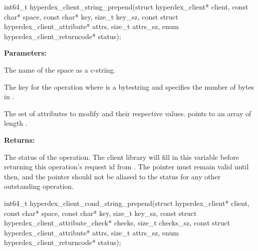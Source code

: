 \funcsep
{}
\begin{ccode}
int64_t hyperdex_client_string_prepend(struct hyperdex_client* client,
                const char* space,
                const char* key, size_t key_sz,
                const struct hyperdex_client_attribute* attrs, size_t attrs_sz,
                enum hyperdex_client_returncode* status);
\end{ccode}
\funcdesc 

\noindent\textbf{Parameters:}
\begin{description}[labelindent=\widthof{{\code{attrs}, \code{attrs\_sz}}},leftmargin=*,noitemsep,nolistsep,align=right]
\item[\code{space}] The name of the space as a c-string.
\item[\code{key}, \code{key\_sz}] The key for the operation where  is a bytestring and  specifies the number of bytes in .
\item[\code{attrs}, \code{attrs\_sz}] The set of attributes to modify and their respective values.   points to an array of length .
\end{description}

\noindent\textbf{Returns:}
\begin{description}[labelindent=\widthof{{\code{status}}},leftmargin=*,noitemsep,nolistsep,align=right]
\item[\code{status}] The status of the operation.  The client library will fill in this variable before returning this operation's request id from .  The pointer must remain valid until then, and the pointer should not be aliased to the status for any other outstanding operation.
\end{description}

\funcsep
{}
\begin{ccode}
int64_t hyperdex_client_cond_string_prepend(struct hyperdex_client* client,
                const char* space,
                const char* key, size_t key_sz,
                const struct hyperdex_client_attribute_check* checks, size_t checks_sz,
                const struct hyperdex_client_attribute* attrs, size_t attrs_sz,
                enum hyperdex_client_returncode* status);
\end{ccode}
\funcdesc 

